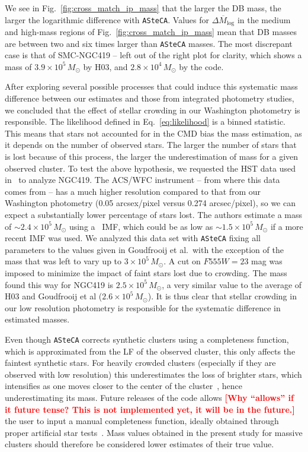\documentclass[draft]{aa}
\newcommand{\LEt}[1]{\textcolor{red}{\textbf{[#1]}}}
\begin{document}
We see in Fig.~\ref{fig:cross_match_ip_mass} that the larger the DB mass, the
larger the logarithmic difference with \texttt{ASteCA}. Values for
$\overline{\Delta M_{\log}}$ in the medium and high-mass regions of
Fig.~\ref{fig:cross_match_ip_mass} mean that DB masses are
between two and six times larger than \texttt{ASteCA} masses.
%
The most discrepant case is that of SMC-NGC419 -- left out of
the right plot for clarity, which shows a mass of $3.9{\times}10^5\,M_{\odot}$
by H03, and $2.8{\times}10^4\,M_{\odot}$ by the code.

After exploring several possible processes that could induce this systematic
mass difference between our estimates and those from integrated photometry
studies, we concluded that the effect of stellar crowding
in our Washington photometry is responsible.
%
The likelihood defined in Eq.~\ref{eq:likelihood} is a binned statistic. This
means that stars not accounted for in the CMD bias the mass estimation,
as it depends on the number of observed stars. The larger the number of stars that is
lost because of this process, the larger the underestimation of mass for a given
observed cluster.
%
To test the above hypothesis, we requested the HST data used
in~\cite{Goudfrooij_2014} to analyze NGC419. The ACS/WFC instrument -- from
where this data comes from -- has a much higher resolution compared to that from
our Washington photometry (0.05 arcsex/pixel versus 0.274 arcsec/pixel), so we
can expect a substantially lower percentage of stars lost.
The authors estimate a mass of ${\sim}2.4{\times}10^5\,M_{\odot}$ using
a~\cite{Salpeter_1955} IMF, which could be as low as
${\sim}1.5{\times}10^5\,M_{\odot}$ if a more recent IMF was used.
We analyzed this data set with \texttt{ASteCA} fixing all parameters to the
values given in Goudfrooij et al.\ with the exception of the
mass that was left to vary up to $3{\times}10^5\,M_{\odot}$. A cut on $F555W
{=}23$ mag was imposed to minimize the impact of faint stars lost due to
crowding.
%
The mass found this way for NGC419 is $2.5{\times}10^5\,M_{\odot}$, a
very similar value to the average of H03 and Goudfrooij et al
($2.6{\times}10^5\,M_{\odot}$).
%
It is thus clear that stellar crowding in our low resolution photometry is
responsible for the systematic difference in estimated masses.

Even though \texttt{ASteCA} corrects synthetic clusters using a
completeness function, which is approximated from the LF of the observed cluster, this
only affects the faintest synthetic stars. For heavily crowded clusters 
(especially if they are observed with low resolution) this underestimates the
loss of brighter stars, which intensifies as one moves closer to the center of
the cluster~\citep{Mateo_1988}, hence underestimating its mass.
Future releases of the code allows \LEt{Why ``allows'' if it future tense? This
is not implemented yet, it will be in the future.} the user to input
a manual completeness function, ideally obtained through proper artificial star
tests~\citep[see, e.g.,][]{Aparicio_Gallart_1995}.
%
Mass values obtained in the present study for massive clusters should therefore
be considered lower estimates of their true value.
\end{document}
